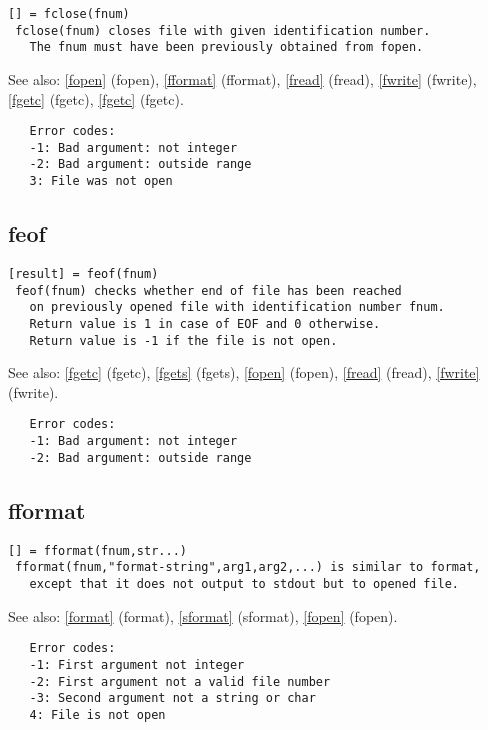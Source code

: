 \documentclass[a4paper]{article}
\begin{document}
\begin{tscreen}
\begin{verbatim}
[] = fclose(fnum)
 fclose(fnum) closes file with given identification number.
   The fnum must have been previously obtained from fopen.
\end{verbatim}

See also: \ref{fopen} {(fopen)}, \ref{fformat} {(fformat)}, \ref{fread} {(fread)}, \ref{fwrite} {(fwrite)}, \ref{fgetc} {(fgetc)}, \ref{fgetc} {(fgetc)}.
\begin{verbatim}
   Error codes:
   -1: Bad argument: not integer
   -2: Bad argument: outside range
   3: File was not open
\end{verbatim}
\end{tscreen}





\subsection{feof\label{feof}}

\begin{tscreen}
\begin{verbatim}
[result] = feof(fnum)
 feof(fnum) checks whether end of file has been reached
   on previously opened file with identification number fnum.
   Return value is 1 in case of EOF and 0 otherwise.
   Return value is -1 if the file is not open.
\end{verbatim}

See also: \ref{fgetc} {(fgetc)}, \ref{fgets} {(fgets)}, \ref{fopen} {(fopen)}, \ref{fread} {(fread)}, \ref{fwrite} {(fwrite)}.
\begin{verbatim}
   Error codes:
   -1: Bad argument: not integer
   -2: Bad argument: outside range
\end{verbatim}
\end{tscreen}





\subsection{fformat\label{fformat}}

\begin{tscreen}
\begin{verbatim}
[] = fformat(fnum,str...)
 fformat(fnum,"format-string",arg1,arg2,...) is similar to format,
   except that it does not output to stdout but to opened file.
\end{verbatim}

See also: \ref{format} {(format)}, \ref{sformat} {(sformat)}, \ref{fopen} {(fopen)}.
\begin{verbatim}
   Error codes:
   -1: First argument not integer
   -2: First argument not a valid file number
   -3: Second argument not a string or char
   4: File is not open
   
\end{verbatim}
\end{tscreen}
\end{document}
